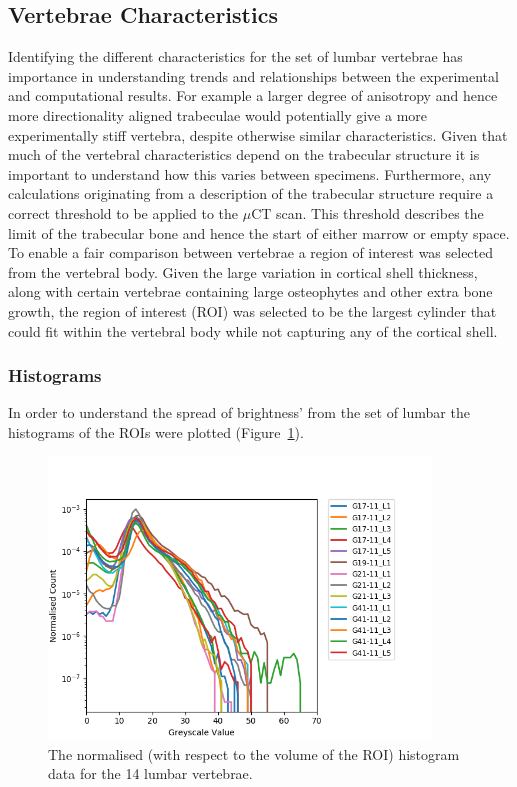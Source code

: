 \subsection{Vertebrae Characteristics}

Identifying the different characteristics for the set of lumbar vertebrae has
importance in understanding trends and relationships between the experimental
and computational results. For example a larger degree of anisotropy and hence
more directionality aligned trabeculae would potentially give a more
experimentally stiff vertebra, despite otherwise similar characteristics. Given
that much of the vertebral characteristics depend on the trabecular structure it
is important to understand how this varies between specimens. Furthermore, any
calculations originating from a description of the trabecular structure require
a correct threshold to be applied to the $\mu$CT scan. This threshold describes
the limit of the trabecular bone and hence the start of either marrow or empty
space. To enable a fair comparison between vertebrae a region of interest was
selected from the vertebral body. Given the large variation in cortical shell
thickness, along with certain vertebrae containing large osteophytes and other
extra bone growth, the region of interest (ROI) was selected to be the largest
cylinder that could fit within the vertebral body while not capturing any of the
cortical shell.

\subsubsection{Histograms}

In order to understand the spread of brightness' from the set of lumbar the
histograms of the ROIs were plotted (Figure~\ref{fig:normalisedhistogram}).

\begin{figure}[ht!]
  \centering
  \includegraphics[width=4in]{Chapters/Chapter_HT_images/Normalised_Histogram.png}
  \caption{The normalised (with respect to the volume of the ROI) histogram data
    for the 14 lumbar vertebrae.}
  \label{fig:normalisedhistogram}
\end{figure}

